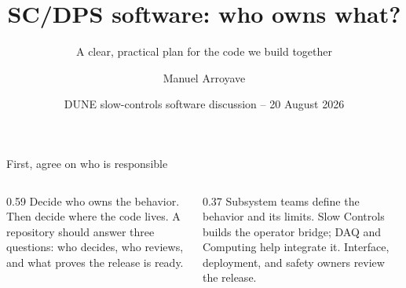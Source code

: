 \documentclass[aspectratio=169,11pt]{beamer}
\title[SC/DPS software ownership]{SC/DPS software: who owns what?}
\subtitle{A clear, practical plan for the code we build together}
\author{Manuel Arroyave}
\date{DUNE slow-controls software discussion -- 20 August 2026}
\begin{document}
\begin{frame}[plain]
  \titlepage
\end{frame}

\begin{frame}{First, agree on who is responsible}
  \begin{columns}[T,onlytextwidth]
    \begin{column}{0.59\textwidth}
        {Decide who owns the behavior. Then decide where the code lives.}
        {A repository should answer three questions: who decides, who reviews, and what proves the release is ready.}
    \end{column}
    \begin{column}{0.37\textwidth}
        {Subsystem teams define the behavior and its limits.}
      \smallskip
        {Slow Controls builds the operator bridge; DAQ and Computing help integrate it.}
      \smallskip
        {Interface, deployment, and safety owners review the release.}
    \end{column}
  \end{columns}
\end{frame}
\end{document}
